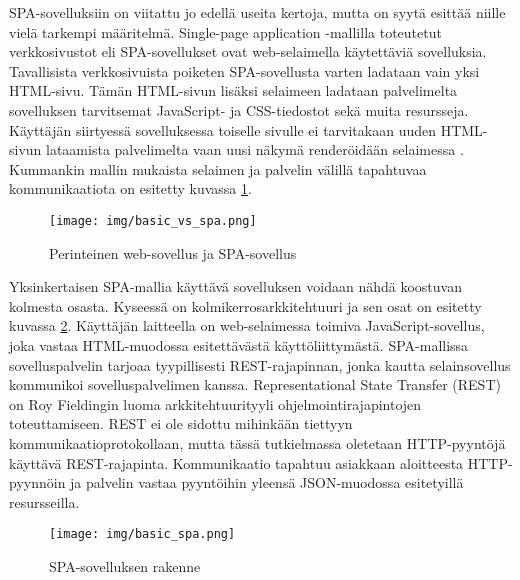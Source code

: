 \documentclass[finnish,twoside,censored,csm,sw-track-2018]{HYthesisML}
\begin{document}
SPA-sovelluksiin on viitattu jo edellä useita kertoja, mutta on syytä esittää niille vielä tarkempi määritelmä. Single-page application -mallilla toteutetut verkkosivustot eli SPA-sovellukset ovat web-selaimella käytettäviä sovelluksia. Tavallisista verkkosivuista poiketen SPA-sovellusta varten ladataan vain yksi HTML-sivu. Tämän HTML-sivun lisäksi selaimeen ladataan palvelimelta sovelluksen tarvitsemat JavaScript- ja CSS-tiedostot sekä muita resursseja. Käyttäjän siirtyessä sovelluksessa toiselle sivulle ei tarvitakaan uuden HTML-sivun lataamista palvelimelta vaan uusi näkymä renderöidään selaimessa \citep{ReactGlossary}. Kummankin mallin mukaista selaimen ja palvelin välillä tapahtuvaa kommunikaatiota on esitetty kuvassa \ref{fig-basic-vs-spa}.

\begin{figure}[ht]
  \centering
    \texttt{[image: img/basic\_vs\_spa.png]}
  \caption{Perinteinen web-sovellus ja SPA-sovellus}
  \label{fig-basic-vs-spa}
\end{figure}

Yksinkertaisen SPA-mallia käyttävä sovelluksen voidaan nähdä koostuvan kolmesta osasta. Kyseessä on kolmikerrosarkkitehtuuri ja sen osat on esitetty kuvassa \ref{fig-spa-rakenne}. Käyttäjän laitteella on web-selaimessa toimiva JavaScript-sovellus, joka vastaa HTML-muodossa esitettävästä käyttöliittymästä. SPA-mallissa sovelluspalvelin tarjoaa tyypillisesti REST-rajapinnan, jonka kautta selainsovellus kommunikoi sovelluspalvelimen kanssa. Representational State Transfer (REST) on Roy Fieldingin \cite{rest} luoma arkkitehtuurityyli ohjelmointirajapintojen toteuttamiseen. REST ei ole sidottu mihinkään tiettyyn kommunikaatioprotokollaan, mutta tässä tutkielmassa oletetaan HTTP-pyyntöjä käyttävä REST-rajapinta. Kommunikaatio tapahtuu asiakkaan aloitteesta HTTP-pyynnöin ja palvelin vastaa pyyntöihin yleensä JSON-muodossa esitetyillä resursseilla.  

\begin{figure}[ht]
  \centering
    \texttt{[image: img/basic\_spa.png]}
  \caption{SPA-sovelluksen rakenne}
  \label{fig-spa-rakenne}
\end{figure}
\end{document}
